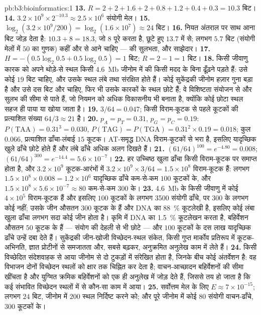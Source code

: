 \begin{solution}{pb:b3:bioinformatics:1}
\textbf{13.} $R = 2 + 2 + 1.6 + 2 + 0.8 + 1.2 + 0.4 + 0.3 = 10.3$ बिट।
\textbf{14.} $3.2\times 10^{9}\times 2^{-10.3} \approx 2.5\times 10^{6}$
संयोगी मेल।
\textbf{15.} $\log_{2}(3.2\times 10^{9}/200) = \log_{2}(1.6\times 10^{7})
\approx 24$ बिट।
\textbf{16.} नियत अंतराल पर साथ आना बिट जोड़ देता है: $10.3 + 8 =
18.3$, जो $8$ पूरे करता है, छूटे हुए $13.7$ में से; लगभग $5.7$ बिट
(संयोगी मेलों में $50$ का गुणक) कहीं और से आने चाहिए ---  की
सुलभता, और साझेदार।
\textbf{17.} $H = -(0.5\log_{2}0.5 + 0.5\log_{2}0.5) = 1$ बिट; $R = 2 -
1 = 1$ बिट।
\textbf{18.} किसी जीवाणु कारक को अपने थोड़े-से स्थल किसी
\qty{4.6}{Mb} जीनोम में  की किसी मदद के बिना ढूँढ़ने पड़ते हैं:
उसे कोई $19$ बिट चाहिए, और उसके स्थल लंबे तथा संरक्षित होते हैं। कोई
सुकेंद्रकी जीनोम हज़ार गुना बड़ा है और उसे दस बिट और चाहिए, फिर भी उसके
कारकों के स्थल छोटे हैं; वे विशिष्टता संयोजन से और सुलभ  की
सीमा से पाते हैं, जो नियमन को अधिक विकासनीय भी बनाता है, क्योंकि कोई
छोटा स्थल सहज ही पाया या खोया जाता है।
\textbf{19.} $3/64 = 0.047$; किसी विराम-कूटक से पहले कूटकों की
प्रत्याशित संख्या $64/3 \approx 21$ है।
\textbf{20.} $p_{A} = p_{T} = 0.31$, $p_{G} = p_{C} = 0.19$: $P(\text{TAA})
= 0.31^{3} = 0.030$, $P(\text{TAG}) = P(\text{TGA}) = 0.31^{2}\times 0.19
= 0.018$; कुल $0.066$, प्रत्याशित ढाँचा-लंबाई $15$ कूटक।
AT-समृद्ध DNA विराम-कूटकों से भरा है, इसलिए यादृच्छिक खुले ढाँचे छोटे
होते हैं और लंबे ढाँचे अधिक अलग दिखते हैं।
\textbf{21.} $(61/64)^{100} = e^{-4.80} = 0.008$; $(61/64)^{300} =
e^{-14.4} = 5.6\times 10^{-7}$।
\textbf{22.} हर उच्चिष्ठ खुला ढाँचा किसी विराम-कूटक पर समाप्त होता है,
और $3.2\times
10^{9}$ कूटक-आरंभों में $3.2\times 10^{9}\times 3/64 = 1.5\times
10^{8}$ विराम-कूटक हैं: लगभग $1.5\times 10^{8}\times 0.008 = 1.2\times 10^{6}$
यादृच्छिक ढाँचे कम-से-कम $100$ कूटकों के, और $1.5\times 10^{8}\times
5.6\times 10^{-7} \approx 80$ कम-से-कम $300$ के।
\textbf{23.} \qty{4.6}{Mb} के किसी जीवाणु में कोई $4\times 10^{5}$
विराम-कूटक हैं और इसलिए $100$ कूटकों के लगभग \num{3500} संयोगी ढाँचे,
पर $300$ के लगभग कोई नहीं; उसके जीन औसतन $300$ कूटक के हैं और DNA का
\qty{88}{\%} कूटलेखी है, इसलिए कोई लंबा खुला ढाँचा लगभग सदा कोई जीन
होता है। कृमि में DNA का \qty{1.5}{\%} कूटलेखन करता है, बहिर्वेशन
औसतन $50$ कूटक के हैं --- संयोग की देहली से भी छोटे --- और $100$
कूटकों के दस लाख यादृच्छिक ढाँचे उन्हें दबा देते हैं। सुकेंद्रकी
जीन-खोजी विच्छेदन-स्थल संकेत, किसी गुप्त मार्कोव प्रतिरूप में
कूटक-अभिनति, ज्ञात प्रोटीनों से समजातता और, सबसे बढ़कर, अनुक्रमित
अनुलेख काम में लेते हैं।
\textbf{24.} किसी विच्छेदित संदेशवाहक से आया  जीनोम से दो टुकड़ों
में संरेखित होता है, जिनके बीच कोई अंतर्वेशन है: वह विभाजन दोनों
विच्छेदन स्थलों को क्षार तक चिह्नित कर देता है; वाचन-आच्छादन
बहिर्वेशनों की सीमा खींचता है और युग्मित  क्रमिक बहिर्वेशनों को
एक ही अनुलेख में जोड़ देते हैं, जिससे तय हो जाता है कि कई संभावित
विच्छेदन स्थलों में से कौन-सा काम में आया।
\textbf{25.} सर्वोत्तम मेल के लिए $E \approx 7\times 10^{-15}$; लगभग
$24$ बिट, जीनोम में $200$ स्थल निर्दिष्ट करने को; और पूरे जीनोम में कोई
$80$ संयोगी वाचन-ढाँचे, $300$ कूटकों के।
\end{solution}
